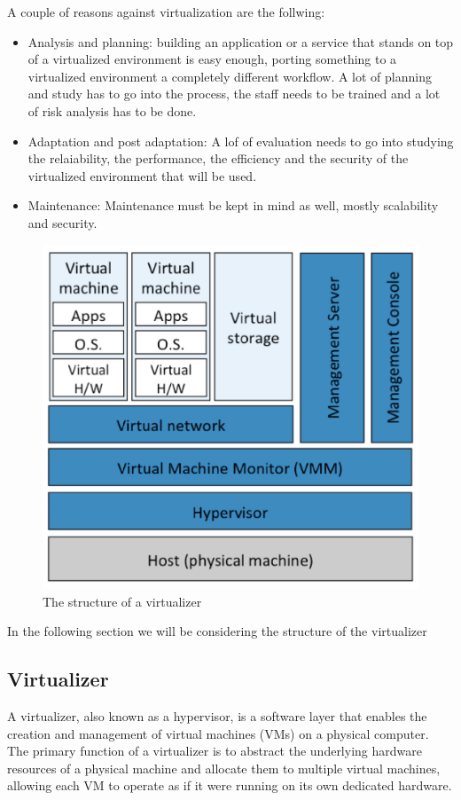 A couple of reasons against virtualization are the follwing:
\begin{itemize}
    \item Analysis and planning: building an application or a service that stands on top of a virtualized environment is easy enough, porting something to a virtualized environment a completely different workflow. A lot of planning and study has to go into the process, the staff needs to be trained and a lot of risk analysis has to be done.
    \item Adaptation and post adaptation: A lof of evaluation needs to go into studying the relaiability, the performance, the efficiency and the security of the virtualized environment that will be used.
    \item Maintenance: Maintenance must be kept in mind as well, mostly scalability and security.
\end{itemize}
\begin{figure}
    \centering
    \includegraphics[scale=0.4]{img/virtualization_components.png}
    \caption{The structure of a virtualizer}
\end{figure}
In the following section we will be considering the structure of the virtualizer
\subsection{Virtualizer}
A virtualizer, also known as a hypervisor, is a software layer that enables the creation and management of virtual machines (VMs) on a physical computer. The primary function of a virtualizer is to abstract the underlying hardware resources of a physical machine and allocate them to multiple virtual machines, allowing each VM to operate as if it were running on its own dedicated hardware.

